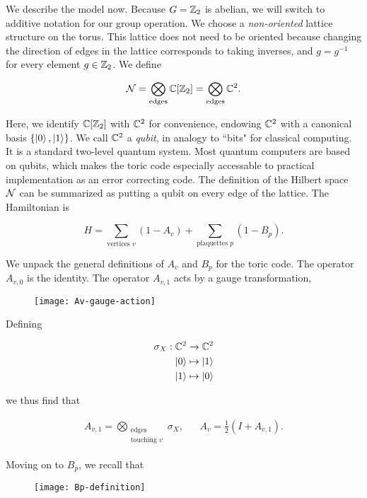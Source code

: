 We describe the model now. Because $G=\mathbb{Z}_2$ is abelian, we will switch to additive notation for our group operation. We choose a \textit{non-oriented} lattice structure on the torus. This lattice does not need to be oriented because changing the direction of edges in the lattice corresponds to taking inverses, and $g=g^{-1}$ for every element $g\in \mathbb{Z}_2$. We define

$$\mathcal{N} = \bigotimes_{\text{edges}}\mathbb{C}[\mathbb{Z}_2]=\bigotimes_{\text{edges}}\mathbb{C}^2.$$

Here, we identify $\mathbb{C}[\mathbb{Z}_2]$ with $\mathbb{C}^2$ for convenience, endowing $\mathbb{C}^2$ with a canonical basis $\{\ket{0},\ket{1}\}$. We call $\mathbb{C}^2$ a \textit{qubit}, in analogy to ``bits" for classical computing. It is a standard two-level quantum system. Most quantum computers are based on qubits, which makes the toric code especially accessable to practical implementation as an error correcting code. The definition of the Hilbert space $\mathcal{N}$ can be summarized as putting a qubit on every edge of the lattice. The Hamiltonian is

$$H=\sum_{\text{vertices }v}(1-A_v)+\sum_{\text{plaquettes }p}(1-B_p).$$

We unpack the general definitions of $A_v$ and $B_p$ for the toric code. The operator $A_{v,0}$ is the identity. The operator $A_{v,1}$ acts by a gauge transformation,

\begin{figure}[h]
\begin{center}
\texttt{[image: Av-gauge-action]}
\end{center}
\end{figure}

Defining

\begin{align*}
\sigma_X:\mathbb{C}^2&\xrightarrow{}\mathbb{C}^2\\
\ket{0}&\mapsto \ket{1}\\
\ket{1}&\mapsto \ket{0}
\end{align*}

we thus find that

\begin{align*}
A_{v,1}=\bigotimes_{\substack{\text{edges} \\ \text{touching }v}}\sigma_X, && A_v=\frac{1}{2}\left(I + A_{v,1}\right).
\end{align*}

Moving on to $B_p$, we recall that

\begin{figure}[h]
\begin{center}
\texttt{[image: Bp-definition]}
\end{center}
\end{figure}

